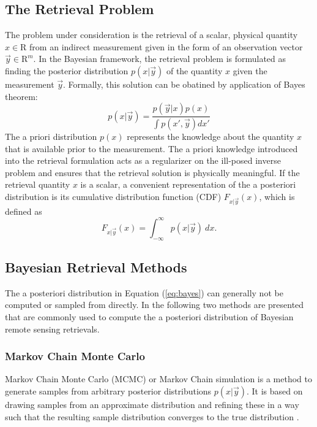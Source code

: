 \documentclass[journal abbreviation, manuscript]{copernicus}
\begin{document}
\subsection{The Retrieval Problem}

The problem under consideration is the retrieval of a scalar, physical quantity
$x \in \mathrm{R}$ from an indirect measurement given in the form of an observation
vector $\vec{y} \in \mathrm{R}^m$. In the Bayesian framework, the retrieval problem is
formulated as finding the posterior distribution $p(x | \vec{y})$ of the
quantity $x$ given the measurement $\vec{y}$. Formally, this solution can be
obatined by application of Bayes theorem:
\begin{equation}\label{eq:bayes}
  p(x | \vec{y}) = \frac{p(\vec{y} | x)p(x)}{\int p(x', \vec{y}) dx'}
\end{equation}
The a priori distribution $p(x)$ represents the knowledge about the quantity $x$ that
is available prior to the measurement. The a priori knowledge introduced into the
retrieval formulation acts as a regularizer on the ill-posed inverse problem and
ensures that the retrieval solution is physically meaningful.
If the retrieval quantity $x$ is a scalar, a convenient representation of the a
posteriori distribution is its cumulative distribution function
(CDF) $F_{x | \vec{y}}(x)$, which is defined as
\begin{equation*}
F_{x | \vec{y}}(x) = \int_{-\infty}^{\infty} p(x | \vec{y}) \: dx.
\end{equation*}

\subsection{Bayesian Retrieval Methods}

The a posteriori distribution in Equation (\ref{eq:bayes}) can generally not
be computed or sampled from directly. In the following two methods are presented
that are commonly used to compute the a posteriori distribution of Bayesian remote
sensing retrievals.

\subsubsection{Markov Chain Monte Carlo}

    Markov Chain Monte Carlo (MCMC) or Markov Chain simulation is a method
    to generate samples from arbitrary posterior distributions $p(x | \vec{y})$.
    It is based on drawing samples from an approximate distribution and
    refining these in a way such that the resulting sample distribution
    converges to the true distribution \citep{bda}.
\end{document}
